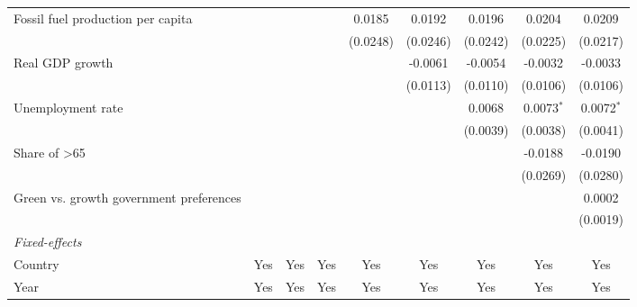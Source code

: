 \begin{table}[htbp]
\begin{tabular}{lcccccccc}
      Fossil fuel production per capita       &                 &                &          & 0.0185        & 0.0192        & 0.0196        & 0.0204         & 0.0209\\   
                                              &                 &                &          & (0.0248)      & (0.0246)      & (0.0242)      & (0.0225)       & (0.0217)\\   
      Real GDP growth                         &                 &                &          &               & -0.0061       & -0.0054       & -0.0032        & -0.0033\\   
                                              &                 &                &          &               & (0.0113)      & (0.0110)      & (0.0106)       & (0.0106)\\   
      Unemployment rate                       &                 &                &          &               &               & 0.0068        & 0.0073$^{*}$   & 0.0072$^{*}$\\   
                                              &                 &                &          &               &               & (0.0039)      & (0.0038)       & (0.0041)\\   
      Share of >65                            &                 &                &          &               &               &               & -0.0188        & -0.0190\\   
                                              &                 &                &          &               &               &               & (0.0269)       & (0.0280)\\   
      Green vs. growth government preferences &                 &                &          &               &               &               &                & 0.0002\\   
                                              &                 &                &          &               &               &               &                & (0.0019)\\   
      \midrule
      \emph{Fixed-effects}\\
      Country                                 & Yes             & Yes            & Yes      & Yes           & Yes           & Yes           & Yes            & Yes\\  
      Year                                    & Yes             & Yes            & Yes      & Yes           & Yes           & Yes           & Yes            & Yes\\  

\end{tabular}
\end{table}

